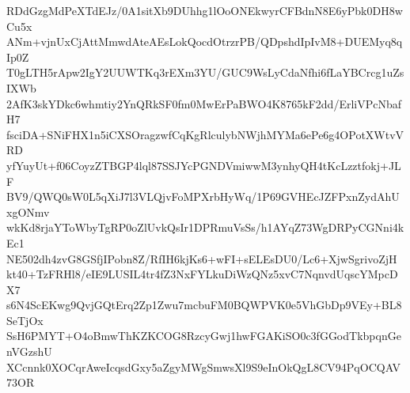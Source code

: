 RDdGzgMdPeXTdEJz/0A1sitXb9DUhhg1lOoONEkwyrCFBdnN8E6yPbk0DH8wCu5x
ANm+vjnUxCjAttMmwdAteAEsLokQocdOtrzrPB/QDpshdIpIvM8+DUEMyq8qIp0Z
T0gLTH5rApw2IgY2UUWTKq3rEXm3YU/GUC9WsLyCdaNfhi6fLaYBCrcg1uZsIXWb
2AfK3skYDkc6whmtiy2YnQRkSF0fm0MwErPaBWO4K8765kF2dd/ErliVPcNbafH7
fsciDA+SNiFHX1n5iCXSOragzwfCqKgRlculybNWjhMYMa6ePe6g4OPotXWtvVRD
yfYuyUt+f06CoyzZTBGP4lql87SSJYcPGNDVmiwwM3ynhyQH4tKcLzztfokj+JLF
BV9/QWQ0sW0L5qXiJ7l3VLQjvFoMPXrbHyWq/1P69GVHEcJZFPxnZydAhUxgONmv
wkKd8rjaYToWbyTgRP0oZlUvkQsIr1DPRmuVsSs/h1AYqZ73WgDRPyCGNni4kEc1
NE502dh4zvG8GSfjIPobn8Z/RfIH6kjKs6+wFI+sELEsDU0/Lc6+XjwSgrivoZjH
kt40+TzFRHl8/eIE9LUSIL4tr4fZ3NxFYLkuDiWzQNz5xvC7NqnvdUqscYMpcDX7
s6N4ScEKwg9QvjGQtErq2Zp1Zwu7mcbuFM0BQWPVK0e5VhGbDp9VEy+BL8SeTjOx
SsH6PMYT+O4oBmwThKZKCOG8RzcyGwj1hwFGAKiSO0c3fGGodTkbpqnGenVGzshU
XCcnnk0XOCqrAweIcqsdGxy5aZgyMWgSmwsXl9S9eInOkQgL8CV94PqOCQAV73OR
